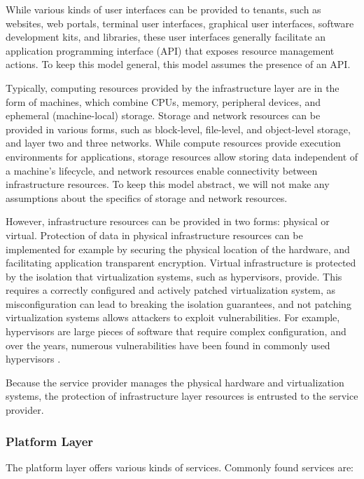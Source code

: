 While various kinds of user interfaces can be provided to tenants, such as
websites, web portals, terminal user interfaces, graphical user interfaces,
software development kits, and libraries, these user interfaces generally
facilitate an application programming interface (API) that exposes resource
management actions. To keep this model general, this model assumes the presence
of an API.

Typically, computing resources provided by the infrastructure layer are in the
form of machines, which combine CPUs, memory, peripheral devices, and ephemeral
(machine-local) storage. Storage and network resources can be provided in
various forms, such as block-level, file-level, and object-level storage, and
layer two and three networks. While compute resources provide execution
environments for applications, storage resources allow storing data independent
of a machine's lifecycle, and network resources enable connectivity between
infrastructure resources. To keep this model abstract, we will not make any
assumptions about the specifics of storage and network resources.

However, infrastructure resources can be provided in two forms: physical or
virtual. Protection of data in physical infrastructure resources can be
implemented for example by securing the physical location of the hardware, and
facilitating application transparent encryption. Virtual infrastructure is
protected by the isolation that virtualization systems, such as hypervisors,
provide. This requires a correctly configured and actively patched
virtualization system, as misconfiguration can lead to breaking the isolation
guarantees, and not patching virtualization systems allows attackers to exploit
vulnerabilities. For example, hypervisors are large pieces of software that
require complex configuration, and over the years, numerous vulnerabilities have
been found in commonly used hypervisors
\cite{perezbotero2013hypervisorvulnerabilities,
reuben2007surveyvirtualmachinesecurity}.

Because the service provider manages the physical hardware and virtualization
systems, the protection of infrastructure layer resources is entrusted to the
service provider.

\subsubsection{Platform Layer}

The platform layer offers various kinds of services. Commonly found services
are:

